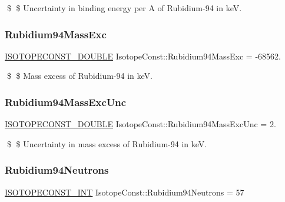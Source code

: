 \$ \$ Uncertainty in binding energy per A of Rubidium-\/94 in keV. \mbox{\label{group___isotope_const-_rubidium-_rb94_ga05ccaf4888e8777e30a97e8972f9d279}} 
\subsubsection{\texorpdfstring{Rubidium94\+Mass\+Exc}{Rubidium94MassExc}}
{\footnotesize\ttfamily \mbox{\hyperlink{group___isotope_const-_macros_ga8f45a7272ce02c0b4c65c44636ed719a}{I\+S\+O\+T\+O\+P\+E\+C\+O\+N\+S\+T\+\_\+\+D\+O\+U\+B\+LE}} Isotope\+Const\+::\+Rubidium94\+Mass\+Exc = -\/68562.}

\$ \$ Mass excess of Rubidium-\/94 in keV. \mbox{\label{group___isotope_const-_rubidium-_rb94_ga61871e4fada4ee0522d5a1b297881459}} 
\subsubsection{\texorpdfstring{Rubidium94\+Mass\+Exc\+Unc}{Rubidium94MassExcUnc}}
{\footnotesize\ttfamily \mbox{\hyperlink{group___isotope_const-_macros_ga8f45a7272ce02c0b4c65c44636ed719a}{I\+S\+O\+T\+O\+P\+E\+C\+O\+N\+S\+T\+\_\+\+D\+O\+U\+B\+LE}} Isotope\+Const\+::\+Rubidium94\+Mass\+Exc\+Unc = 2.}

\$ \$ Uncertainty in mass excess of Rubidium-\/94 in keV. \mbox{\label{group___isotope_const-_rubidium-_rb94_gae7fdb1e383781569bc51af4a0990224d}} 
\subsubsection{\texorpdfstring{Rubidium94\+Neutrons}{Rubidium94Neutrons}}
{\footnotesize\ttfamily \mbox{\hyperlink{group___isotope_const-_macros_ga5f18360b3e99483a35c32d789e62621c}{I\+S\+O\+T\+O\+P\+E\+C\+O\+N\+S\+T\+\_\+\+I\+NT}} Isotope\+Const\+::\+Rubidium94\+Neutrons = 57}

